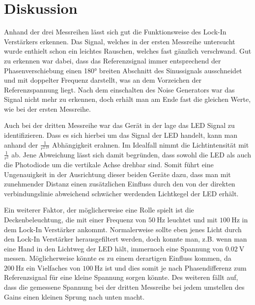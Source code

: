 \documentclass[
  bibliography=totoc,     %
  captions=tableheading,  %
  titlepage=firstiscover, %
]{scrartcl}
\begin{document}
\section{Diskussion}
\label{sec:diskussion}

Anhand der drei Messreihen lässt sich gut die Funktionsweise des Lock-In Verstärkers
erkennen. Das Signal, welches in der ersten Messreihe untersucht wurde enthielt
schon ein leichtes Rauschen, welches fast gänzlich verschwand. Gut zu erkennen war
dabei, dass das Referenzsignal immer entsprechend der Phasenverschiebung einen 180°
breiten Abschnitt des Sinussignals ausschneidet und mit doppelter Frequenz darstellt,
was an dem Vorzeichen der Referenzspannung liegt.
Nach dem einschalten des Noise Generators war das Signal nicht mehr zu erkennen,
doch erhält man am Ende fast die gleichen Werte, wie bei der ersten Messreihe.

Auch bei der dritten Messreihe war das Gerät in der lage das LED Signal zu identifizieren.
Dass es sich hierbei um das Signal der LED handelt, kann man anhand der $\frac{1}{r^{2.18}}$
Abhängigkeit erahnen. Im Idealfall nimmt die Lichtintensität mit $\frac{1}{r^2}$ ab.
Jene Abweichung lässt sich damit begründen, dass sowohl die LED als auch die Photodiode
um die vertikale Achse drehbar sind. Somit führt eine Ungenauigkeit in der Ausrichtung
dieser beiden Geräte dazu, dass man mit zunehmender Distanz einen zusätzlichen
Einfluss durch den von der direkten verbindungslinie abweichend schwächer werdenden
Lichtkegel der LED erhält.

Ein weiterer Faktor, der möglicherweise eine Rolle spielt ist die Deckenbeleuchtung,
die mit einer Frequenz von $\SI{50}{\hertz}$ leuchtet und mit $\SI{100}{\hertz}$ in
dem Lock-In Verstärker ankommt. Normalerweise sollte eben jenes Licht durch den Lock-In
Verstärker herausgefiltert werden, doch konnte man, z.B. wenn man eine Hand in den
Lichtweg der LED hält, immernoch eine Spannung von $\SI{0.02}{\volt}$ messen. Möglicherweise
könnte es zu einem derartigen Einfluss kommen, da $\SI{200}{\hertz}$ ein Vielfaches
von $\SI{100}{\hertz}$ ist und dies somit je nach Phasendifferenz zum Referenzsignal
für eine kleine Spannung sorgen könnte. Des weiteren fällt auf, dass die gemessene Spannung
bei der dritten Messreihe bei jedem umstellen des Gains einen kleinen Sprung nach unten macht.
\nocite{*}
\printbibliography
\end{document}

